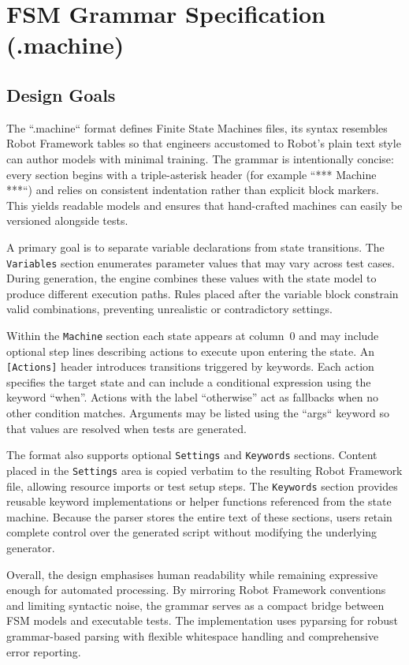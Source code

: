 \section{FSM Grammar Specification (.machine)}

\subsection{Design Goals}

The ``.machine`` format defines Finite State Machines files, its syntax resembles Robot Framework tables so that engineers accustomed to Robot's plain text style can author models with minimal training. The grammar is intentionally concise: every section begins with a triple-asterisk header (for example ``*** Machine ***``) and relies on consistent indentation rather than explicit block markers. This yields readable models and ensures that hand-crafted machines can easily be versioned alongside tests.

A primary goal is to separate variable declarations from state transitions. The \texttt{Variables} section enumerates parameter values that may vary across test cases. During generation, the engine combines these values with the state model to produce different execution paths. Rules placed after the variable block constrain valid combinations, preventing unrealistic or contradictory settings.

Within the \texttt{Machine} section each state appears at column~0 and may
include optional step lines describing actions to execute upon entering the
state. An \texttt{[Actions]} header introduces transitions triggered by keywords.
Each action specifies the target state and can include a conditional expression
using the keyword ``when''. Actions with the label ``otherwise'' act as fallbacks
when no other condition matches. Arguments may be listed using the ``args``
keyword so that values are resolved when tests are generated.

The format also supports optional \texttt{Settings} and \texttt{Keywords}
sections. Content placed in the \texttt{Settings} area is copied verbatim to the
resulting Robot Framework file, allowing resource imports or test setup steps.
The \texttt{Keywords} section provides reusable keyword implementations or
helper functions referenced from the state machine. Because the parser stores the
entire text of these sections, users retain complete control over the generated
script without modifying the underlying generator.

Overall, the design emphasises human readability while remaining expressive
enough for automated processing. By mirroring Robot Framework conventions and
limiting syntactic noise, the grammar serves as a compact bridge between FSM
models and executable tests. The implementation uses pyparsing for robust
grammar-based parsing with flexible whitespace handling and comprehensive
error reporting.

